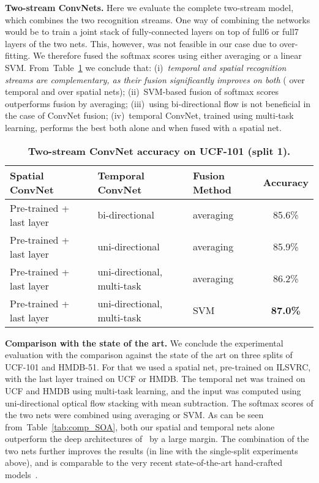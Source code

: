 \documentclass{article} \usepackage{nips14submit_e,times}
\newcommand{\tblref}[1]{Table~\ref{#1}}
\begin{document}
\noindent\textbf{Two-stream ConvNets.}
Here we evaluate the complete two-stream model, which combines the two recognition streams. 
One way of combining the networks would be to train a joint stack of fully-connected layers on top of full6 or full7 layers of the two nets.
This, however, was not feasible in our case due to over-fitting. We therefore fused the softmax scores using either averaging or a linear SVM.
From~\tblref{tab:fusion} we conclude that: 
(i)~\emph{temporal and spatial recognition streams are complementary, as their fusion significantly improves on both} ( over temporal and  over spatial nets);
(ii)~SVM-based fusion of softmax scores outperforms fusion by averaging;
(iii)~using bi-directional flow is not beneficial in the case of ConvNet fusion; 
(iv)~temporal ConvNet, trained using multi-task learning, performs the best both alone and when fused with a spatial net.
\begin{table}[ht]
\small
\centering
\caption{\textbf{Two-stream ConvNet accuracy on UCF-101 (split 1).}
}
\begin{tabular}{|l|l|l|c|} \hline
Spatial ConvNet & Temporal ConvNet & Fusion Method & Accuracy \\ \hline
Pre-trained + last layer & bi-directional & averaging & 85.6\% \\ \hline
Pre-trained + last layer & uni-directional & averaging & 85.9\%  \\ \hline
Pre-trained + last layer & uni-directional, multi-task & averaging  & 86.2\% \\ \hline
Pre-trained + last layer & uni-directional, multi-task & SVM & \textbf{87.0\%} \\ \hline
\end{tabular}
\label{tab:fusion}
\end{table}


\noindent\textbf{Comparison with the state of the art.}
We conclude the experimental evaluation with the comparison against the state of the art on three splits of UCF-101 and HMDB-51.
For that we used a spatial net, pre-trained on ILSVRC, with the last layer trained on UCF or HMDB. 
The temporal net was trained on UCF and HMDB using multi-task learning, and the input was computed using uni-directional optical flow stacking with 
mean subtraction. The softmax scores of the two nets were combined using averaging or SVM.
As can be seen from~\tblref{tab:comp_SOA}, both our spatial and temporal nets alone outperform the deep architectures of~\cite{Karpathy14,Kuehne11} by a large margin.
The combination of the two nets further improves the results (in line with the single-split experiments above), and is comparable to the very recent 
state-of-the-art hand-crafted models~\cite{Wang13b,Peng14,Peng14a}.
\end{document}
